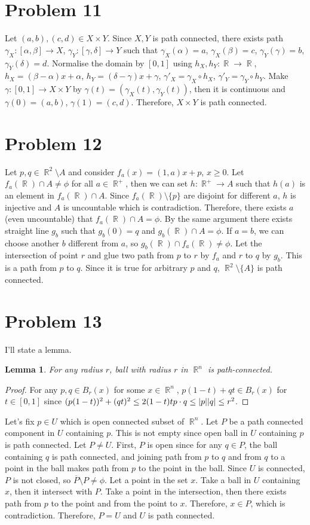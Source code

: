 \documentclass{article}
\DeclareMathOperator{\rr}{\mathbb{R}}
\DeclarePairedDelimiter\abs{\lvert}{\rvert}%
\newtheorem{lemma}{Lemma}
\begin{document}
\section*{Problem 11}
Let $(a,b),(c,d)\in X\times Y$. Since $X,Y$ is path connected, there exists path $\gamma_X:[\alpha,\beta]\rightarrow X$, $\gamma_Y:[\gamma, \delta]\rightarrow Y$ such that $\gamma_X(\alpha)=a$, $\gamma_X(\beta)=c$, $\gamma_Y(\gamma)=b$, $\gamma_Y(\delta)=d$. Normalise the domain by $[0,1]$ using $h_X, h_Y:\rr\rightarrow \rr$, $h_X=(\beta-\alpha)x+\alpha$, $h_Y=(\delta-\gamma)x+\gamma$, $\gamma'_X=\gamma_X\circ h_X$, $\gamma'_Y=\gamma_Y\circ h_Y$. Make $\gamma:[0, 1]\rightarrow X\times Y$ by $\gamma(t)=(\gamma_X(t), \gamma_Y(t))$, then it is continuous and $\gamma(0)=(a,b)$, $\gamma(1)=(c,d)$. Therefore, $X\times Y$ is path connected.
\section*{Problem 12}
Let $p,q\in \rr^2\setminus A$ and consider $f_a(x)=(1, a)x+p$, $x\geq 0$. Let $f_a(\rr)\cap A\neq \phi$ for all $a\in \rr^+$, then we can set $h:\rr^+\rightarrow A$ such that $h(a)$ is an element in $f_a(\rr)\cap A$. Since $f_a(\rr)\setminus\{p\}$ are disjoint for different $a$, $h$ is injective and $A$ is uncountable which is contradiction. Therefore, there exists $a$ (even uncountable) that $f_a(\rr)\cap A=\phi$. By the same argument there exists straight line $g_b$ such that $g_b(0)=q$ and $g_b(\rr)\cap A=\phi$. If $a=b$, we can choose another $b$ different from $a$, so $g_b(\rr)\cap f_a(\rr)\neq\phi$. Let the intersection of point $r$ and glue two path from $p$ to $r$ by $f_a$ and $r$ to $q$ by $g_b$. This is a path from $p$ to $q$. Since it is true for arbitrary $p$ and $q$, $\rr^2\setminus\{A\}$ is path connected.
\section*{Problem 13}
I'll state a lemma.
\begin{lemma}
For any radius $r$, ball with radius $r$ in $\rr^n$ is path-connected.
\end{lemma}
\begin{proof}
For any $p,q\in B_r(x)$ for some $x\in \rr^n$, $p(1-t)+qt\in B_r(x)$ for $t\in [0,1]$ since $(p(1-t))^2+(qt)^2\leq 2 (1-t)tp\cdot q\leq \abs{p}\abs{q}\leq r^2$.
\end{proof}
Let's fix $p\in U$ which is open connected subset of $\rr^n$. Let $P$ be a path connected component in $U$ containing $p$. This is not empty since open ball in $U$ containing $p$ is path connected. Let $P\neq U$. First, $P$ is open since for any $q\in P$, the ball containing $q$ is path connected, and joining path from $p$ to $q$ and from $q$ to a point in the ball makes path from $p$ to the point in the ball. Since $U$ is connected, $P$ is not closed, so $\overline{P}\setminus P\neq \phi$. Let a point in the set $x$. Take a ball in $U$ containing $x$, then it intersect with $P$. Take a point in the intersection, then there exists path from $p$ to the point and from the point to $x$. Therefore, $x\in P$, which is contradiction. Therefore, $P=U$ and $U$ is path connected.
\end{document}
